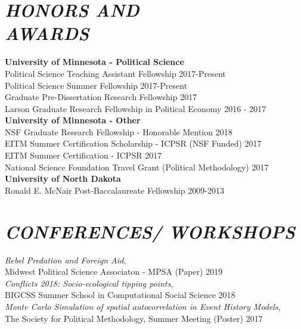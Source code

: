 \documentclass[margin, 10pt]{res} %
\begin{document}
\begin{resume}
\section{\footnotesize \textit{HONORS AND \\ AWARDS}}
\textbf{University of Minnesota - Political Science}\\
\-\hspace{5mm} Political Science Teaching Assistant Fellowship \hfill 2017-Present\\
\-\hspace{5mm} Political Science Summer Fellowship \hfill 2017-Present\\
\-\hspace{5mm} Graduate Pre-Dissertation Research Fellowship \hfill 2017\\
\-\hspace{5mm} Larson Graduate Research Fellowship in Political Economy \hfill 2016 - 2017\\ 
\textbf{University of Minnesota - Other}\\
\-\hspace{5mm} NSF Graduate Research Fellowship - Honorable Mention \hfill 2018\\
\-\hspace{5mm} EITM Summer Certification Scholarship - ICPSR (NSF Funded) \hfill 2017\\
\-\hspace{5mm} EITM Summer Certification - ICPSR \hfill 2017\\
\-\hspace{5mm} National Science Foundation Travel Grant (Political Methodology) \hfill 2017 
\textbf{University of North Dakota}\\
\-\hspace{5mm} Ronald E. McNair Post-Baccalaureate Fellowship \hfill 2009-2013


\section{\footnotesize \textit{CONFERENCES/ WORKSHOPS}}
\textit{Rebel Predation and Foreign Aid},\\
\-\hspace{5mm} Midwest Political Science Associaton - MPSA (Paper) \hfill 2019\\
\textit{Conflicts 2018: Socio-ecological tipping points},\\
\-\hspace{5mm} BIGCSS Summer School in Computational Social Science \hfill 2018\\
\textit{Monte Carlo Simulation of spatial autocorrelation in Event History Models},\\
\-\hspace{5mm} The Society for Political Methodology, Summer Meeting (Poster) \hfill 2017


\end{resume}
\end{document}
